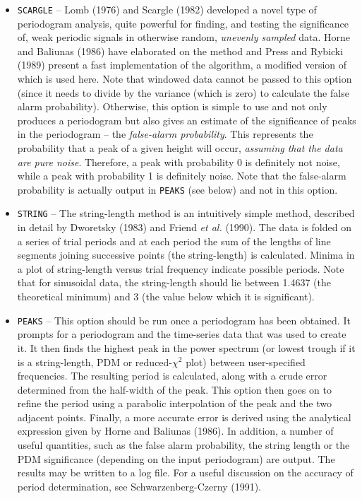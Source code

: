 \begin{itemize}
\item {\tt SCARGLE} -- Lomb (1976) and Scargle (1982) developed a novel type of
periodogram analysis, quite powerful for finding, and testing the significance
of, weak periodic signals in otherwise random, {\em unevenly sampled} data.
Horne and Baliunas (1986) have elaborated on the method and Press and Rybicki
(1989) present a fast implementation of the algorithm, a modified version of
which is used here. Note that windowed data cannot be passed to this option
(since it needs to divide by the variance (which is zero) to calculate the
false alarm probability). Otherwise, this option is simple to use and not only
produces a periodogram but also gives an estimate of the significance of peaks
in the periodogram -- the {\em false-alarm probability}. This represents the
probability that a peak of a given height will occur, {\em assuming that the
data are pure noise}. Therefore, a peak with probability 0 is definitely not
noise, while a peak with probability 1 is definitely noise. Note that the
false-alarm probability is actually output in {\tt PEAKS} (see below) and not
in this option. 

\item {\tt STRING} -- The string-length method is an intuitively simple method,
described in detail by Dworetsky (1983) and Friend {\it et al.} (1990). The
data is folded on a series of trial periods and at each period the sum of the
lengths of line segments joining successive points (the string-length) is
calculated. Minima in a plot of string-length versus trial frequency indicate
possible periods. Note that for sinusoidal data, the string-length should lie
between 1.4637 (the theoretical minimum) and 3 (the value below which it is
significant). 

\item {\tt PEAKS} -- This option should be run once a periodogram has been
obtained. It prompts for a periodogram and the time-series data that was used
to create it. It then finds the highest peak in the power spectrum (or lowest
trough if it is a string-length, PDM or reduced-$\chi^2$ plot) between
user-specified frequencies. The resulting period is calculated, along with a
crude error determined from the half-width of the peak. This option then goes
on to refine the period using a parabolic interpolation of the peak and the two
adjacent points. Finally, a more accurate error is derived using the analytical
expression given by Horne and Baliunas (1986). In addition, a number of useful
quantities, such as the false alarm probability, the string length or the PDM
significance (depending on the input periodogram) are output. The results may 
be written to a log file. For a useful discussion on the accuracy of period
determination, see Schwarzenberg-Czerny (1991). 


\end{itemize}
